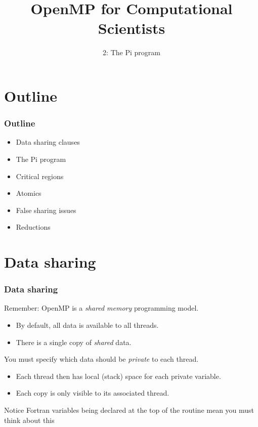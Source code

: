 \documentclass{beamer}
\title{OpenMP for Computational Scientists}
\subtitle{2: The Pi program}
\begin{document}
\frame{\titlepage}


\section{Outline}
\begin{frame}
\frametitle{Outline}
\begin{itemize}
  \item Data sharing clauses
  \item The Pi program
  \item Critical regions
  \item Atomics
  \item False sharing issues
  \item Reductions
\end{itemize}
\end{frame}

\section{Data sharing}
\begin{frame}
\frametitle{Data sharing}
Remember: OpenMP is a \emph{shared memory} programming model.
\begin{itemize}
  \item By default, all data is available to all threads.
  \item There is a single copy of \emph{shared} data.
\end{itemize}

\vfill

You must specify which data should be \emph{private} to each thread.
\begin{itemize}
  \item Each thread then has local (stack) space for each private variable.
  \item Each copy is only visible to its associated thread.
\end{itemize}

\begin{block}{Notice}
Fortran variables being declared at the top of the routine mean you must think about this
\end{block}

\end{frame}
\end{document}
